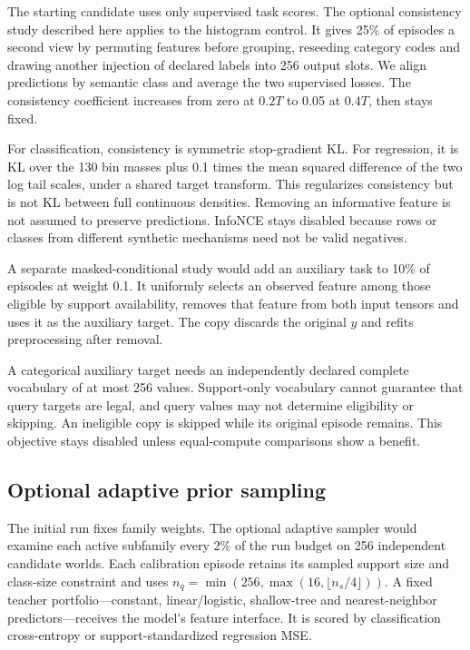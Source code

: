 \documentclass[11pt]{article}
\begin{document}
The starting candidate uses only supervised task scores. The optional consistency study described here applies to the histogram control. It gives 25\% of episodes a second view by permuting features before grouping, reseeding category codes and drawing another injection of declared labels into 256 output slots. We align predictions by semantic class and average the two supervised losses. The consistency coefficient increases from zero at $0.2T$ to 0.05 at $0.4T$, then stays fixed.

For classification, consistency is symmetric stop-gradient KL. For regression, it is KL over the 130 bin masses plus 0.1 times the mean squared difference of the two log tail scales, under a shared target transform. This regularizes consistency but is not KL between full continuous densities. Removing an informative feature is not assumed to preserve predictions. InfoNCE stays disabled because rows or classes from different synthetic mechanisms need not be valid negatives.

A separate masked-conditional study would add an auxiliary task to 10\% of episodes at weight 0.1. It uniformly selects an observed feature among those eligible by support availability, removes that feature from both input tensors and uses it as the auxiliary target. The copy discards the original $y$ and refits preprocessing after removal.

A categorical auxiliary target needs an independently declared complete vocabulary of at most 256 values. Support-only vocabulary cannot guarantee that query targets are legal, and query values may not determine eligibility or skipping. An ineligible copy is skipped while its original episode remains. This objective stays disabled unless equal-compute comparisons show a benefit.

\subsection{Optional adaptive prior sampling}
\label{sec:adaptive-training}

The initial run fixes family weights. The optional adaptive sampler would examine each active subfamily every 2\% of the run budget on 256 independent candidate worlds. Each calibration episode retains its sampled support size and class-size constraint and uses $n_q=\min(256,\max(16,\lfloor n_s/4\rfloor))$. A fixed teacher portfolio---constant, linear/logistic, shallow-tree and nearest-neighbor predictors---receives the model's feature interface. It is scored by classification cross-entropy or support-standardized regression MSE.
\end{document}
